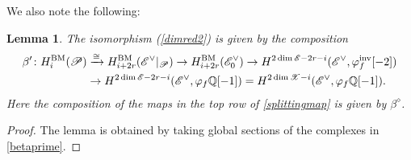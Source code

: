 \documentclass [11pt,oneside,a4paper,mathscr]{amsart}
\newtheorem{lemma}[thm]{Lemma}
\theoremstyle{definition}
\newcommand{\X}{\mathscr{X}}
\begin{document}
We also note the following: 
\begin{lemma}
The isomorphism (\ref{dimred2}) 
is given by the composition 
\begin{align}\label{splittingmap}
 \beta'\colon H^{\mathrm{BM}}_i(\mathscr{P})&\xrightarrow{\cong} H^{\mathrm{BM}}_{i+2r}(\mathscr{E}^\vee|_\mathscr{P})
 \to H^{\mathrm{BM}}_{i+2r}(\mathscr{E}^\vee_0)\to 
 H^{2\dim\mathscr{E}-2r-i}
 (\mathscr{E}^\vee, \varphi_f^{\mathrm{inv}}[-2])\\
 \notag&\to 
 H^{2\dim\mathscr{E}-2r-i}
 (\mathscr{E}^\vee, \varphi_f\mathbb{Q}[-1])=H^{2\dim\X-i}(\mathscr{E}^\vee, \varphi_f\mathbb{Q}[-1]).\end{align}
 Here the composition of the maps in the top row of \eqref{splittingmap} is given by $\beta^\diamond$.
 \end{lemma}
 \begin{proof}
The lemma is obtained by taking global sections of the complexes in \eqref{betaprime}. 
      \end{proof}
\end{document}

